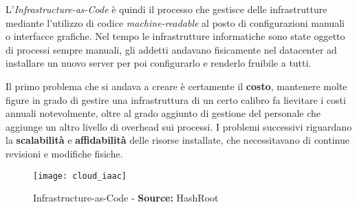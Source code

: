 \documentclass[../main.tex]{subfiles}
\begin{document}
            L'\emph{Infrastructure-as-Code}\cite{cloud_iac} è quindi il processo che gestisce delle infrastrutture mediante l'utilizzo di codice \emph{machine-readable} al posto di configurazioni manuali o interfacce grafiche. Nel tempo le infrastrutture informatiche sono state oggetto di processi sempre manuali, gli addetti andavano fisicamente nel datacenter ad installare un nuovo server per poi configurarlo e renderlo fruibile a tutti.
            
            Il primo problema che si andava a creare è certamente il \textbf{costo}, mantenere molte figure in grado di gestire una infrastruttura di un certo calibro fa lievitare i costi annuali notevolmente, oltre al grado aggiunto di gestione del personale che aggiunge un altro livello di overhead sui processi. I problemi successivi riguardano la \textbf{scalabilità} e \textbf{affidabilità} delle risorse installate, che necessitavano di continue revisioni e modifiche fisiche.
            
            \begin{figure}[h]
    			\centering
    			\texttt{[image: cloud\_iaac]}
    			\caption{Infrastructure-as-Code - \textbf{Source:} HashRoot}
    			\label{fig:cloud_iaac}
    	    \end{figure}
            
\end{document}
